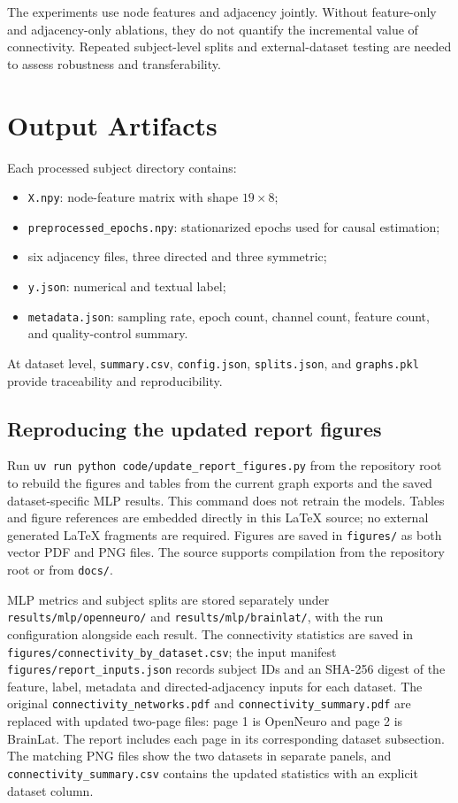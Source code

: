 \documentclass[11pt,a4paper]{article}
\begin{document}
The experiments use node features and adjacency jointly. Without feature-only
and adjacency-only ablations, they do not quantify the incremental value of
connectivity. Repeated subject-level splits and external-dataset testing are
needed to assess robustness and transferability.

\section{Output Artifacts}

Each processed subject directory contains:
\begin{itemize}
    \item \texttt{X.npy}: node-feature matrix with shape $19\times8$;
    \item \texttt{preprocessed\_epochs.npy}: stationarized epochs used for
          causal estimation;
    \item six adjacency files, three directed and three symmetric;
    \item \texttt{y.json}: numerical and textual label;
    \item \texttt{metadata.json}: sampling rate, epoch count, channel count,
          feature count, and quality-control summary.
\end{itemize}
At dataset level, \texttt{summary.csv}, \texttt{config.json},
\texttt{splits.json}, and \texttt{graphs.pkl} provide traceability and
reproducibility.

\subsection{Reproducing the updated report figures}

Run \texttt{uv run python code/update\_report\_figures.py} from the
repository root to rebuild the figures and tables from the current graph
exports and the saved dataset-specific MLP results. This command does not
retrain the models. Tables and figure references are embedded directly in
this LaTeX source; no external generated LaTeX fragments are required.
Figures are saved in \texttt{figures/} as both vector PDF and PNG files.
The source supports compilation from the repository root or from \texttt{docs/}.

MLP metrics and subject splits are stored separately under
\texttt{results/mlp/openneuro/} and \texttt{results/mlp/brainlat/}, with the
run configuration alongside each result. The connectivity statistics are
saved in \texttt{figures/connectivity\_by\_dataset.csv}; the input manifest
\texttt{figures/report\_inputs.json} records subject IDs and an SHA-256 digest
of the feature, label, metadata and directed-adjacency inputs for each dataset.
The original \texttt{connectivity\_networks.pdf} and
\texttt{connectivity\_summary.pdf} are replaced with updated two-page files:
page 1 is OpenNeuro and page 2 is BrainLat. The report includes each page
in its corresponding dataset subsection. The matching PNG files show the
two datasets in separate panels, and \texttt{connectivity\_summary.csv}
contains the updated statistics with an explicit dataset column.
\end{document}
